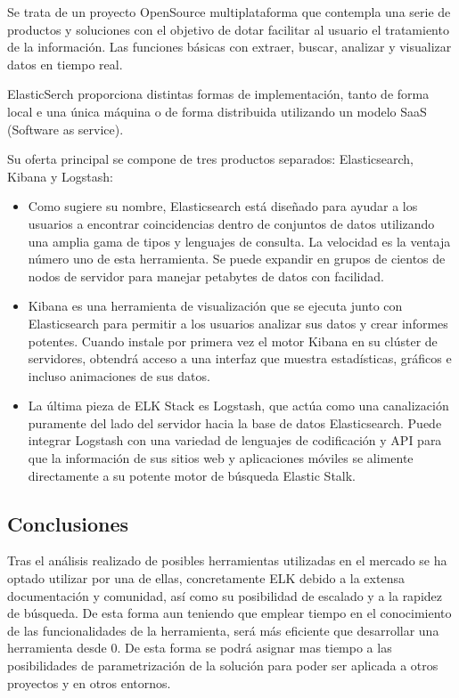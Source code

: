 Se trata de un proyecto OpenSource multiplataforma que contempla una serie de productos y soluciones con el objetivo de dotar facilitar al usuario el tratamiento de la información. Las funciones básicas con extraer, buscar, analizar y visualizar datos en tiempo real.

ElasticSerch proporciona distintas formas de implementación, tanto de forma local e una única máquina o de forma distribuida utilizando un modelo SaaS (Software as service).

Su oferta principal se compone de tres productos separados: Elasticsearch, Kibana y Logstash:

\begin{itemize}

\item Como sugiere su nombre, Elasticsearch está diseñado para ayudar a los usuarios a encontrar coincidencias dentro de conjuntos de datos utilizando una amplia gama de tipos y lenguajes de consulta. La velocidad es la ventaja número uno de esta herramienta. Se puede expandir en grupos de cientos de nodos de servidor para manejar petabytes de datos con facilidad.

\item Kibana es una herramienta de visualización que se ejecuta junto con Elasticsearch para permitir a los usuarios analizar sus datos y crear informes potentes. Cuando instale por primera vez el motor Kibana en su clúster de servidores, obtendrá acceso a una interfaz que muestra estadísticas, gráficos e incluso animaciones de sus datos.

\item La última pieza de ELK Stack es Logstash, que actúa como una canalización puramente del lado del servidor hacia la base de datos Elasticsearch. Puede integrar Logstash con una variedad de lenguajes de codificación y API para que la información de sus sitios web y aplicaciones móviles se alimente directamente a su potente motor de búsqueda Elastic Stalk.

\end{itemize}

\subsection{Conclusiones}

Tras el análisis realizado de posibles herramientas utilizadas en el mercado se ha optado utilizar por una de ellas, concretamente ELK debido a la extensa documentación y comunidad, así como su posibilidad de escalado y a la rapidez de búsqueda. De esta forma aun teniendo que emplear tiempo en el conocimiento de las funcionalidades de la herramienta, será más eficiente que desarrollar una herramienta desde 0. De esta forma se podrá asignar mas tiempo a las posibilidades de parametrización de la solución para poder ser aplicada a otros proyectos y en otros entornos.



